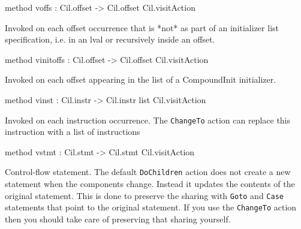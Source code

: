 \documentclass[11pt]{article}
\begin{document}
\begin{ocamldocobjectend}
\begin{ocamldocdescription}
\end{ocamldocdescription}


\label{method:Cil.cilVisitor.voffs}\begin{ocamldoccode}
method voffs : Cil.offset -> Cil.offset Cil.visitAction
\end{ocamldoccode}
\begin{ocamldocdescription}
Invoked on each offset occurrence that is *not* as part
 of an initializer list specification, i.e. in an lval or
 recursively inside an offset.


\end{ocamldocdescription}


\label{method:Cil.cilVisitor.vinitoffs}\begin{ocamldoccode}
method vinitoffs : Cil.offset -> Cil.offset Cil.visitAction
\end{ocamldoccode}
\begin{ocamldocdescription}
Invoked on each offset appearing in the list of a 
 CompoundInit initializer.


\end{ocamldocdescription}


\label{method:Cil.cilVisitor.vinst}\begin{ocamldoccode}
method vinst : Cil.instr -> Cil.instr list Cil.visitAction
\end{ocamldoccode}
\begin{ocamldocdescription}
Invoked on each instruction occurrence. The {\tt{ChangeTo}} action can
 replace this instruction with a list of instructions


\end{ocamldocdescription}


\label{method:Cil.cilVisitor.vstmt}\begin{ocamldoccode}
method vstmt : Cil.stmt -> Cil.stmt Cil.visitAction
\end{ocamldoccode}
\begin{ocamldocdescription}
Control-flow statement. The default {\tt{DoChildren}} action does not 
 create a new statement when the components change. Instead it updates 
 the contents of the original statement. This is done to preserve the 
 sharing with {\tt{Goto}} and {\tt{Case}} statements that point to the original 
 statement. If you use the {\tt{ChangeTo}} action then you should take care 
 of preserving that sharing yourself.


\end{ocamldocdescription}



\end{ocamldocobjectend}
\end{document}
